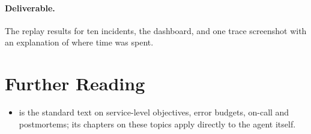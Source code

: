 \paragraph{Deliverable.} The replay results for ten incidents, the dashboard, and one trace screenshot with an explanation of where time was spent.

\section*{Further Reading}

\begin{itemize}[itemsep=2pt]
  \item \citet{beyer2016sre} is the standard text on service-level objectives, error budgets, on-call and postmortems; its chapters on these topics apply directly to the agent itself.
\end{itemize}
